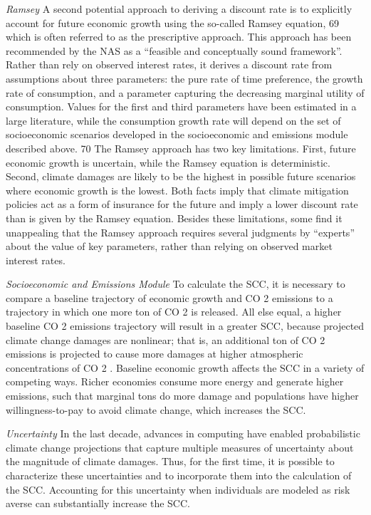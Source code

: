 \documentclass[
]{book}
\begin{document}
\emph{Ramsey}
A second potential approach to deriving a discount rate is to explicitly account for
future economic growth using the so-called Ramsey equation, 69 which is often referred to
as the prescriptive approach. This approach has been recommended by the NAS as a
``feasible and conceptually sound framework''. Rather than rely on observed
interest rates, it derives a discount rate from assumptions about three parameters: the
pure rate of time preference, the growth rate of consumption, and a parameter capturing
the decreasing marginal utility of consumption. Values for the first and third parameters
have been estimated in a large literature, while the consumption growth rate will depend
on the set of socioeconomic scenarios developed in the socioeconomic and emissions
module described above. 70
The Ramsey approach has two key limitations. First, future economic growth is
uncertain, while the Ramsey equation is deterministic. Second, climate damages are
likely to be the highest in possible future scenarios where economic growth is the lowest.
Both facts imply that climate mitigation policies act as a form of insurance for the
future and imply a lower discount rate than is given by the Ramsey equation. Besides
these limitations, some find it unappealing that the Ramsey approach requires several
judgments by ``experts'' about the value of key parameters, rather than relying on
observed market interest rates.

\emph{Socioeconomic and Emissions Module}
To calculate the SCC, it is necessary to compare a baseline trajectory of
economic growth and CO 2 emissions to a trajectory in which one more ton of CO 2 is
released. All else equal, a higher baseline CO 2 emissions trajectory will result in a
greater SCC, because projected climate change damages are nonlinear; that is, an
additional ton of CO 2 emissions is projected to cause more damages at higher
atmospheric concentrations of CO 2 .
Baseline economic growth affects the SCC in a
variety of competing ways. Richer economies consume more energy and generate higher
emissions, such that marginal tons do more damage and populations have higher
willingness-to-pay to avoid climate change, which increases the SCC.

\emph{Uncertainty}
In the last decade, advances in
computing have enabled probabilistic climate change projections that capture multiple
measures of uncertainty about the magnitude of climate damages. Thus, for the first
time, it is possible to characterize these uncertainties and to incorporate them into the
calculation of the SCC.
Accounting for this uncertainty when individuals are modeled as risk averse can
substantially increase the SCC.
\end{document}
